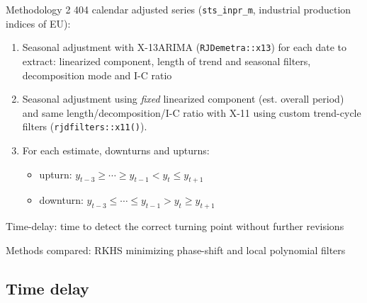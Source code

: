 \documentclass[10pt,xcolor=table,color={dvipsnames,usenames},ignorenonframetext,usepdftitle=false,english]{beamer}
\providecommand{\tightlist}{%
  \setlength{\parskip}{0pt}
  }
\newcommand\1{\mathds{1}}
\begin{document}
\begin{frame}[fragile]{Methodology}
\protect\hypertarget{methodology-1}{}
2 404 calendar adjusted series (\texttt{sts\_inpr\_m}, industrial
production indices of EU):

\begin{enumerate}
\tightlist
\item
  Seasonal adjustment with X-13ARIMA (\texttt{RJDemetra::x13}) for each
  date to extract: linearized component, length of trend and seasonal
  filters, decomposition mode and I-C ratio
\end{enumerate}

\pause

\begin{enumerate}
\setcounter{enumi}{1}
\tightlist
\item
  Seasonal adjustment using \emph{fixed} linearized component (est.
  overall period) and same length/decomposition/I-C ratio with X-11
  using custom trend-cycle filters (\texttt{rjdfilters::x11()}).
\end{enumerate}

\pause

\begin{enumerate}
\setcounter{enumi}{2}
\item
  For each estimate, downturns and upturns:

  \begin{itemize}
  \item
    upturn: \(y_{t-3}\geq\cdots\geq y_{t-1}<y_t\leq y_{t+1}\)
  \item
    downturn: \(y_{t-3}\leq\cdots\leq y_{t-1}>y_t\geq y_{t+1}\)
  \end{itemize}
\end{enumerate}

\pause

Time-delay: time to detect the correct turning point without further
revisions

Methods compared: RKHS minimizing phase-shift and local polynomial
filters
\end{frame}

\hypertarget{time-delay}{%
\subsection{Time delay}\label{time-delay}}
\end{document}
